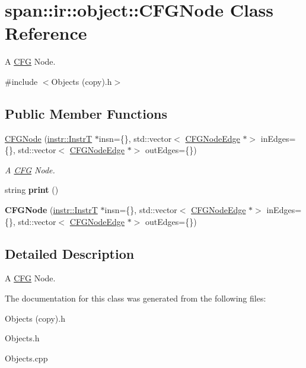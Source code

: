 \hypertarget{classspan_1_1ir_1_1object_1_1CFGNode}{}\section{span\+:\+:ir\+:\+:object\+:\+:C\+F\+G\+Node Class Reference}
\label{classspan_1_1ir_1_1object_1_1CFGNode}


A \hyperlink{classspan_1_1ir_1_1object_1_1CFG}{C\+FG} Node.  




{\ttfamily \#include $<$Objects (copy).\+h$>$}

\subsection*{Public Member Functions}
\begin{DoxyCompactItemize}
\item 
\mbox{\label{classspan_1_1ir_1_1object_1_1CFGNode_ae6355946eadd2efc508bec2b85b6e3a6}} 
\hyperlink{classspan_1_1ir_1_1object_1_1CFGNode_ae6355946eadd2efc508bec2b85b6e3a6}{C\+F\+G\+Node} (\hyperlink{classspan_1_1ir_1_1instr_1_1InstrT}{instr\+::\+InstrT} $\ast$insn=\{\}, std\+::vector$<$ \hyperlink{classspan_1_1ir_1_1object_1_1CFGNodeEdge}{C\+F\+G\+Node\+Edge} $\ast$$>$ in\+Edges=\{\}, std\+::vector$<$ \hyperlink{classspan_1_1ir_1_1object_1_1CFGNodeEdge}{C\+F\+G\+Node\+Edge} $\ast$$>$ out\+Edges=\{\})
\begin{DoxyCompactList}\small\item\em A \hyperlink{classspan_1_1ir_1_1object_1_1CFG}{C\+FG} Node. \end{DoxyCompactList}\item 
\mbox{\label{classspan_1_1ir_1_1object_1_1CFGNode_a503c422e31bc420bd828fe6d4704347a}} 
string {\bfseries print} ()
\item 
\mbox{\label{classspan_1_1ir_1_1object_1_1CFGNode_aeeaccb636c3913c7bbf7f5f37acd7a26}} 
{\bfseries C\+F\+G\+Node} (\hyperlink{classspan_1_1ir_1_1instr_1_1InstrT}{instr\+::\+InstrT} $\ast$insn=\{\}, std\+::vector$<$ \hyperlink{classspan_1_1ir_1_1object_1_1CFGNodeEdge}{C\+F\+G\+Node\+Edge} $\ast$$>$ in\+Edges=\{\}, std\+::vector$<$ \hyperlink{classspan_1_1ir_1_1object_1_1CFGNodeEdge}{C\+F\+G\+Node\+Edge} $\ast$$>$ out\+Edges=\{\})
\end{DoxyCompactItemize}


\subsection{Detailed Description}
A \hyperlink{classspan_1_1ir_1_1object_1_1CFG}{C\+FG} Node. 

The documentation for this class was generated from the following files\+:\begin{DoxyCompactItemize}
\item 
Objects (copy).\+h\item 
Objects.\+h\item 
Objects.\+cpp\end{DoxyCompactItemize}
